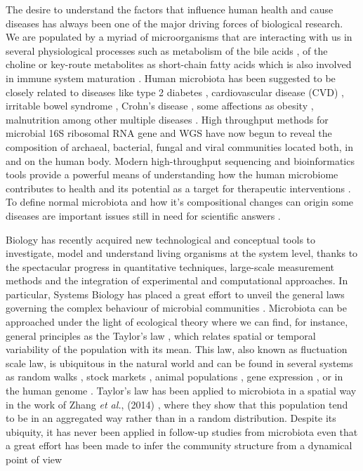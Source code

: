 The desire to understand the factors that influence human health and cause diseases has always been one of the major driving forces of biological research. We are populated by a myriad of microorganisms that are interacting with us in several physiological processes such as metabolism of the bile acids \cite{bileacids}, of the choline \cite{choline} or key-route metabolites as short-chain fatty acids \cite{scfa1, scfa2} which is also involved in immune system maturation \cite{scfa3, scfa4}. Human microbiota has been suggested to be closely related to diseases like type 2 diabetes \cite{diabetes2}, cardiovascular disease (CVD) \cite{CVD}, irritable bowel syndrome \cite{IBS}, Crohn's disease \cite{CD}, some affections as obesity \cite{ob1, ob2}, malnutrition \cite{nutr} among other multiple diseases \cite{Moya_trends}. High throughput methods for microbial 16S ribosomal RNA gene and WGS have now begun to reveal the composition of archaeal, bacterial, fungal and viral communities located both, in and on the human body. Modern high-throughput sequencing and bioinformatics tools provide a powerful means of understanding how the human microbiome contributes to health and its potential as a target for therapeutic interventions \cite{microb&health}. To define normal microbiota and how it's compositional changes can origin some diseases are important issues still in need for scientific answers \cite{normal1, normal2}.

Biology has recently acquired new technological and conceptual tools to investigate, model and understand living organisms at the system level, thanks to the spectacular progress in quantitative techniques, large-scale measurement methods and the integration of experimental and computational approaches. In particular, Systems Biology has placed a great effort to unveil the general laws governing the complex behaviour of microbial communities \cite{sysbio&microb, msys1, metasysbio}. Microbiota can be approached under the light of ecological theory where we can find, for instance, general principles as the Taylor's law \cite{taylor}, which relates spatial or temporal variability of the population with its mean. This law, also known as fluctuation scale law, is ubiquitous in the natural world and can be found in several systems as random walks \cite{randomwalks}, stock markets \cite{economics1, economics2}, animal populations \cite{taylor, animal1, animal2}, gene expression \cite{genexpress}, or in the human genome \cite{genome}. Taylor's law has been applied to microbiota in a spatial way in the work of Zhang {\it et al.}, (2014) \cite{isme1}, where they show that this population tend to be in an aggregated way rather than in a random distribution. Despite its ubiquity, it has never been applied in follow-up studies from microbiota even that a great effort has been made to infer the community structure from a dynamical point of view \cite{cobas, schloss, ravel}  


